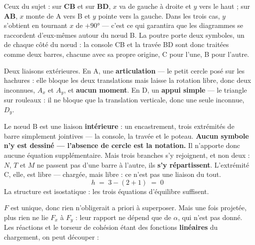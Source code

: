 Ceux du sujet : sur \textbf{CB} et sur \textbf{BD}, $x$ va de gauche à droite et $y$ vers le haut ; sur \textbf{AB}, $x$ monte de A vers B et $y$ pointe vers la gauche. Dans les trois cas, $y$ s'obtient en tournant $x$ de $+90°$ — c'est ce qui garantira que les diagrammes se raccordent d'eux-mêmes autour du nœud B. La poutre porte deux symboles, un de chaque côté du nœud : la console CB et la travée BD sont donc traitées comme deux barres, chacune avec sa propre origine, C pour l'une, B pour l'autre.


Deux liaisons extérieures. En A, une \textbf{articulation} — le petit cercle posé sur les hachures : elle bloque les deux translations mais laisse la rotation libre, donc deux inconnues, $A_x$ et $A_y$, et \textbf{aucun moment}. En D, un \textbf{appui simple} — le triangle sur rouleaux : il ne bloque que la translation verticale, donc une seule inconnue, $D_y$.

Le nœud B est une liaison \textbf{intérieure} : un encastrement, trois extrémités de barre simplement jointives — la console, la travée et le poteau. \textbf{Aucun symbole n'y est dessiné — l'absence de cercle est la notation.} Il n'apporte donc aucune équation supplémentaire. Mais trois branches s'y rejoignent, et non deux : $N$, $T$ et $M$ ne passent pas d'une barre à l'autre, ils \textbf{s'y répartissent}. L'extrémité C, elle, est libre — chargée, mais libre : ce n'est pas une liaison du tout.
\[ h \;=\; 3 - (2 + 1) \;=\; 0 \]
La structure est isostatique : les trois équations d'équilibre suffisent.


$F$ est unique, donc rien n'obligerait a priori à superposer. Mais une fois projetée, plus rien ne lie $F_x$ à $F_y$ : leur rapport ne dépend que de $\alpha$, qui n'est pas donné. Les réactions et le torseur de cohésion étant des fonctions \textbf{linéaires} du chargement, on peut découper :

